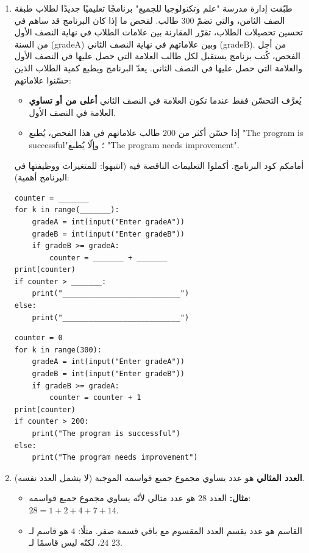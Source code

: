 \documentclass[14pt]{extarticle}
\begin{document}
\begin{enumerate}[label=\textbf{تمرين \arabic*:}, wide=0pt, itemsep=2.2em]
\item طبّقت إدارة مدرسة "علم وتكنولوجيا للجميع" برنامجًا تعليميًا جديدًا لطلاب طبقة الصف الثامن، والتي تضمّ $300$ طالب. لفحص ما إذا كان البرنامج قد ساهم في تحسين تحصيلات الطلاب، تقرّر المقارنة بين علامات الطلاب في نهاية النصف الأول من السنة (\textenglish{gradeA}) وبين علاماتهم في نهاية النصف الثاني (\textenglish{gradeB}).
من أجل الفحص، كُتب برنامج يستقبل لكل طالب العلامة التي حصل عليها في النصف الأول والعلامة التي حصل عليها في النصف الثاني. يعدّ البرنامج ويطبع كمية الطلاب الذين حسّنوا علاماتهم:
\begin{itemize}
\item يُعرَّف التحسّن فقط عندما تكون العلامة في النصف الثاني \textbf{أعلى من أو تساوي} العلامة في النصف الأول.
\item إذا حسّن أكثر من $200$ طالب علاماتهم في هذا الفحص، يُطبع \textenglish{"The program is successful"}؛ وإلّا يُطبع \textenglish{"The program needs improvement"}.
\end{itemize}
أمامكم كود البرنامج. أكملوا التعليمات الناقصة فيه (انتبهوا: للمتغيرات ووظيفتها في البرنامج أهمية):

\begin{boxCode}
\begin{english}
\begin{verbatim}
counter = _______
for k in range(_______):
    gradeA = int(input("Enter gradeA"))
    gradeB = int(input("Enter gradeB"))
    if gradeB >= gradeA:
        counter = _______ + _______
print(counter)
if counter > _______:
    print("___________________________")
else:
    print("___________________________")
\end{verbatim}
\end{english}
\end{boxCode}

\ifwithsols
\begin{boxSolution}
\begin{english}
\begin{verbatim}
counter = 0
for k in range(300):
    gradeA = int(input("Enter gradeA"))
    gradeB = int(input("Enter gradeB"))
    if gradeB >= gradeA:
        counter = counter + 1
print(counter)
if counter > 200:
    print("The program is successful")
else:
    print("The program needs improvement")
\end{verbatim}
\end{english}
\end{boxSolution}
\fi
\filbreak

\item \textbf{العدد المثالي} هو عدد يساوي مجموع جميع قواسمه الموجبة (لا يشمل العدد نفسه).
\begin{itemize}
\item \textbf{مثال:} العدد $28$ هو عدد مثالي لأنّه يساوي مجموع جميع قواسمه: $28 = 1 + 2 + 4 + 7 + 14$.
\item القاسم هو عدد يقسم العدد المقسوم مع باقي قسمة صفر. مثلًا: $4$ هو قاسم لـ $24$، لكنّه ليس قاسمًا لـ $23$.
\end{itemize}


\end{enumerate}
\end{document}
